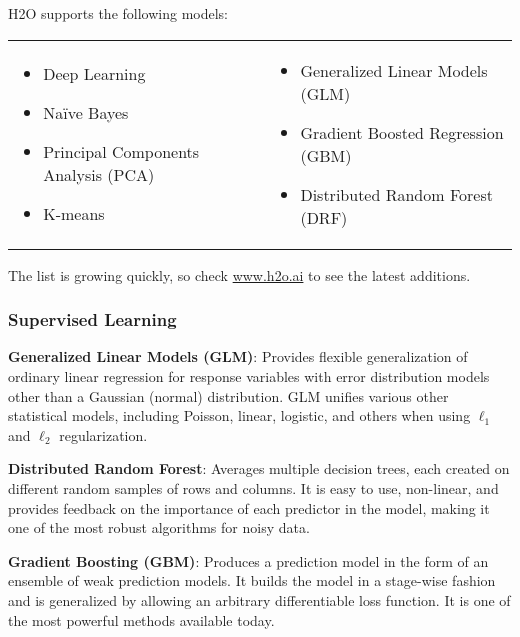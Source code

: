 {H2O supports the following models:  


\begin{frame}%

\begin{tabular}{p{5.5cm}p{5.5cm}}

\begin{itemize}
  \item Deep Learning
  \item Na\"{i}ve Bayes
  \item Principal Components Analysis (PCA)
  \item K-means
\end{itemize} &

\begin{itemize}
  \item Generalized Linear Models (GLM) 
  \item Gradient Boosted Regression (GBM)
  \item Distributed Random Forest (DRF)
\end{itemize}

\end{tabular}

\end{frame}


The list is growing quickly, so check \url{www.h2o.ai} to see the latest additions. 

\subsubsection{Supervised Learning}


{\textbf{Generalized Linear Models (GLM)}}: Provides flexible generalization of ordinary linear regression for response variables with error distribution models other than a Gaussian (normal) distribution. GLM unifies various other statistical models, including Poisson, linear, logistic, and others when using $\ell_1$ and $\ell_2$ regularization.

{\textbf{Distributed Random Forest}}: Averages multiple decision trees, each created on different random samples of rows and columns. It is easy to use, non-linear, and provides feedback on the importance of each predictor in the model, making it one of the most robust algorithms for noisy data.

{\textbf{Gradient Boosting (GBM)}}: Produces a prediction model in the form of an ensemble of weak prediction models. It builds the model in a stage-wise fashion and is generalized by allowing an arbitrary differentiable loss function. It is one of the most powerful methods available today.

}
